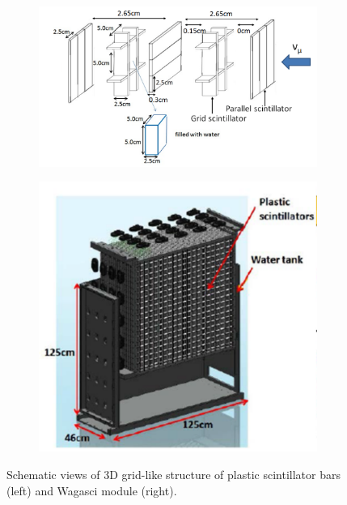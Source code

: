 \begin{figure}[tbhp]
  \begin{center}
   \begin{subfigure}{0.48\textwidth}
     \includegraphics[width=\linewidth]{fig/3d_grid_structure.pdf}
    \end{subfigure}
  \begin{subfigure}{0.48\textwidth}
      \includegraphics[width=\linewidth]{fig/wagasci_mod.pdf}
    \end{subfigure}    
    \end{center}
  \caption{Schematic views of 3D grid-like structure of plastic scintillator bars (left) and Wagasci module (right).}
\label{fig:3dgrid_wagascimod}
\end{figure}

